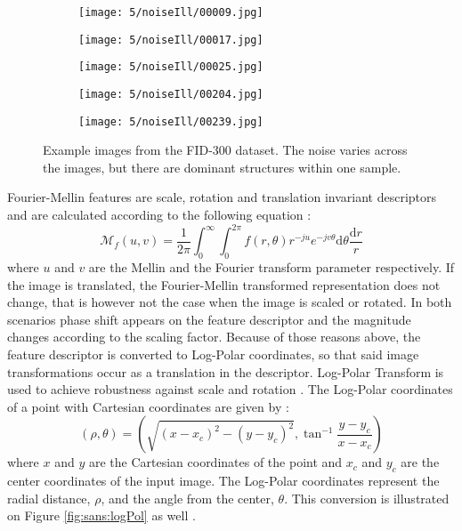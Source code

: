 \documentclass[draft,final]{vutinfth} %
\begin{document}
\begin{figure}[h]
\centering
  \begin{subfigure}[t]{0.19\columnwidth}
    \centering
    \texttt{[image: 5/noiseIll/00009.jpg]}
  \end{subfigure}
  \begin{subfigure}[t]{0.19\columnwidth}
    \centering
    \texttt{[image: 5/noiseIll/00017.jpg]}
  \end{subfigure}
  \begin{subfigure}[t]{0.19\columnwidth}
    \centering
    \texttt{[image: 5/noiseIll/00025.jpg]}
  \end{subfigure}
  \begin{subfigure}[t]{0.19\columnwidth}
    \centering
    \texttt{[image: 5/noiseIll/00204.jpg]}
  \end{subfigure}
  \begin{subfigure}[t]{0.19\columnwidth}
    \centering
    \texttt{[image: 5/noiseIll/00239.jpg]}
  \end{subfigure}
\caption{Example images from the FID-300 dataset. The noise varies across the images, but there are dominant structures within one sample.}
\label{fig:sans:noiseIll}

\end{figure}
\par
Fourier-Mellin features are scale, rotation and translation invariant descriptors and are calculated according to the following equation \cite{kazik2011visual}:
\[\mathcal{M}_f(u,v) = \frac{1}{2\pi} \int_{0}^{\infty}\int_{0}^{2\pi} f(r, \theta)r^{-ju}e^{-jv\theta}\mathrm{d}\theta\frac{\mathrm{d}r}{r}\]
where $u$ and $v$ are the Mellin and the Fourier transform parameter respectively.
If the image is translated, the Fourier-Mellin transformed representation does not change, that is however not the case when the image is scaled or rotated.
In both scenarios phase shift appears on the feature descriptor and the magnitude changes according to the scaling factor.
Because of those reasons above, the feature descriptor is converted to Log-Polar coordinates, so that said image transformations occur as a translation in the descriptor.
Log-Polar Transform is used to achieve robustness against scale and rotation  \cite{gueham2008automatic}.
The Log-Polar coordinates of a point with Cartesian coordinates are given by \cite{sarvaiya2012image}:
\[(\rho,\theta) = (\sqrt{(x-x_c)^2 - (y-y_c)^2}, \tan^{-1}\frac{y-y_c}{x-x_c})\]
where $x$ and $y$ are the Cartesian coordinates of the point and $x_c$ and $y_c$ are the center coordinates of the input image.
The Log-Polar coordinates represent the radial distance, $\rho$, and the angle from the center, $\theta$.
This conversion is illustrated on Figure \ref{fig:sans:logPol} as well \cite{sarvaiya2012image}.
\end{document}
